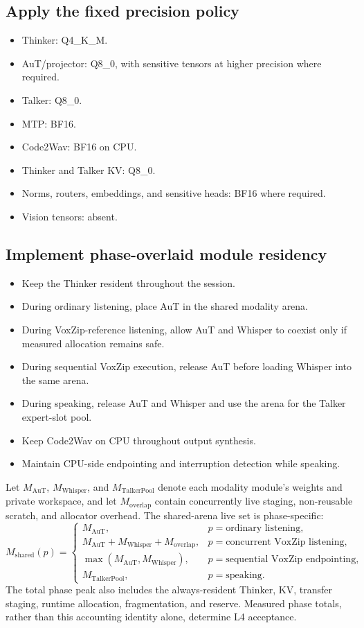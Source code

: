 \documentclass[10pt,letterpaper]{article}
\begin{document}
\subsection{Apply the fixed precision policy}
\begin{itemize}
    \item Thinker: Q4\_K\_M.
    \item AuT/projector: Q8\_0, with sensitive tensors at higher precision where required.
    \item Talker: Q8\_0.
    \item MTP: BF16.
    \item Code2Wav: BF16 on CPU.
    \item Thinker and Talker KV: Q8\_0.
    \item Norms, routers, embeddings, and sensitive heads: BF16 where required.
    \item Vision tensors: absent.
\end{itemize}

\subsection{Implement phase-overlaid module residency}
\begin{itemize}
    \item Keep the Thinker resident throughout the session.
    \item During ordinary listening, place AuT in the shared modality arena.
    \item During VoxZip-reference listening, allow AuT and Whisper to coexist only if measured allocation remains safe.
    \item During sequential VoxZip execution, release AuT before loading Whisper into the same arena.
    \item During speaking, release AuT and Whisper and use the arena for the Talker expert-slot pool.
    \item Keep Code2Wav on CPU throughout output synthesis.
    \item Maintain CPU-side endpointing and interruption detection while speaking.
\end{itemize}

Let $M_{\mathrm{AuT}}$, $M_{\mathrm{Whisper}}$, and
$M_{\mathrm{TalkerPool}}$ denote each modality module's weights and private
workspace, and let $M_{\mathrm{overlap}}$ contain concurrently live staging,
non-reusable scratch, and allocator overhead. The shared-arena live set is
phase-specific:
\[
M_{\mathrm{shared}}(p)=
\begin{cases}
M_{\mathrm{AuT}}, & p=\text{ordinary listening},\\
M_{\mathrm{AuT}}+M_{\mathrm{Whisper}}+M_{\mathrm{overlap}},
    & p=\text{concurrent VoxZip listening},\\
\max(M_{\mathrm{AuT}},M_{\mathrm{Whisper}}),
    & p=\text{sequential VoxZip endpointing},\\
M_{\mathrm{TalkerPool}}, & p=\text{speaking}.
\end{cases}
\]
The total phase peak also includes the always-resident Thinker, KV, transfer
staging, runtime allocation, fragmentation, and reserve. Measured phase totals,
rather than this accounting identity alone, determine L4 acceptance.
\end{document}

